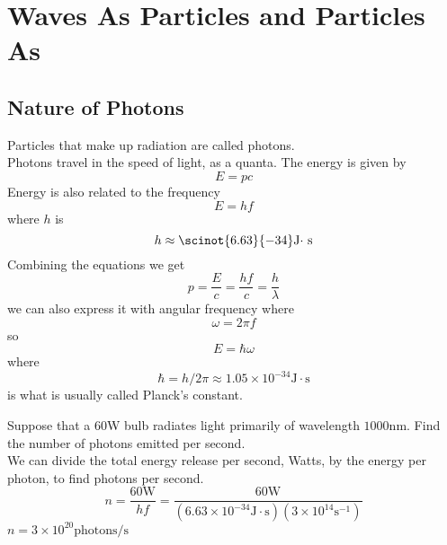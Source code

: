 \chapter{Waves As Particles and Particles As }
\section{Nature of Photons}
Particles that make up radiation are called photons. \\
Photons travel in the speed of light, as a quanta. The energy is given by
\[ E = pc \]
Energy is also related to the frequency
\[ E = hf \]
where $ h $ is 
\[ h \approx \scinot{6.63}{-34} \mbox{J$ \cdot $ s} \]
Combining the equations we get
\[ p = \frac { E } { c } = \frac { h f } { c } = \frac { h } { \lambda } \]
we can also express it with angular frequency where \[ \omega = 2 \pi f \]
so
\[ E = \hbar \omega \]
where
\[ \hbar = h / 2 \pi \approx 1.05 \times 10 ^ { - 34 } \mathrm { J } \cdot \mathrm { s } \]
is what is usually called Planck's constant. 
\begin{example}
	Suppose that a $ 60 $W bulb radiates light primarily of wavelength $ 1000 $nm. Find the number of photons emitted per second. \\
	We can divide the total energy release per second, Watts, by the energy per photon, to find photons per second.
	\[ n = \frac { 60 \mathrm { W } } { h f } = \frac { 60 \mathrm { W } } { \left( 6.63 \times 10 ^ { - 34 } \mathrm { J } \cdot \mathrm { s } \right) \left( 3 \times 10 ^ { 14 } \mathrm { s } ^ { - 1 } \right) } \]
	$ n  = 3 \times 10 ^ { 20 } \mathrm { photons } / \mathrm { s }$
\end{example}
